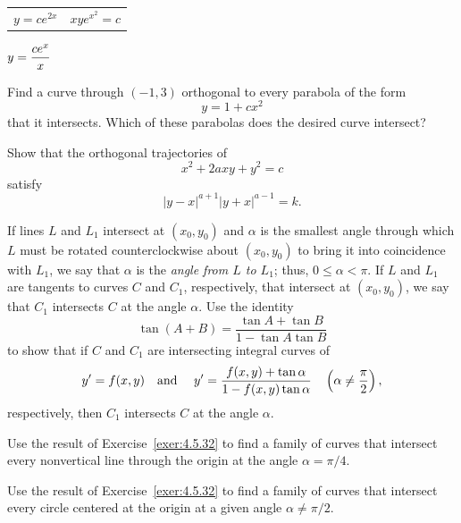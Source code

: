 \begin{exerciselist}
  \begin{tabular}[t]{@{}p{168pt}@{}p{168pt}}
    \item\label{exer:4.5.27} $y=ce^{2x}$ &
    \item\label{exer:4.5.28} $xye^{x^{2}}=c$
  \end{tabular}

  \item\label{exer:4.5.29} $\displaystyle{y=\frac{ce^{x}}{x}}$

  \item\label{exer:4.5.30} Find a curve through $(-1,3)$ orthogonal to every parabola of the form
  \[
    y=1+cx^{2}
  \]
  that it intersects. Which of these parabolas does the desired curve intersect?

  \item\label{exer:4.5.31} Show that the orthogonal trajectories of
  \[
    x^{2}+2axy+y^{2}=c
  \]
  satisfy
  \[
    |y-x|^{a+1}|y+x|^{a-1}=k.
  \]

  \item\label{exer:4.5.32} If lines $L$ and $L_{1}$ intersect at $(x_{0},y_{0})$ and $\alpha$ is the
        smallest angle through which $L$ must be rotated counterclockwise about $(x_{0},y_{0})$ to
        bring it into coincidence with $L_{1}$, we say that $\alpha$ is the {\color{blue}\it angle
        from $L$ to $L_{1}$\/}; thus, $0\le\alpha<\pi$. If $L$ and $L_{1}$ are tangents to curves
        $C$ and $C_{1}$, respectively, that intersect at $(x_{0},y_{0})$, we say that $C_{1}$
        intersects $C$ at the angle $\alpha$. Use the identity
  \[
    \tan(A+B)=\frac{\tan A+\tan B}{1-\tan A\tan B}
  \]
  to show that if $C$ and $C_{1}$ are intersecting integral curves of
  \[
    y'=f(x,y)\mbox{\quad and \quad}y'=\frac{f(x,y)+\tan\alpha}{1-f(x,y)\tan\alpha}\quad\left(\alpha\ne\frac{\pi}{2}\right),
  \]
  respectively, then $C_{1}$ intersects $C$ at the angle $\alpha$.

  \item\label{exer:4.5.33} Use the result of Exercise~\ref{exer:4.5.32} to find a family of curves
        that intersect every nonvertical line through the origin at the angle $\alpha=\pi/4$.

  \item\label{exer:4.5.34} Use the result of Exercise~\ref{exer:4.5.32} to find a family of curves
        that intersect every circle centered at the origin at a given angle $\alpha\ne\pi/2$.
\end{exerciselist}
